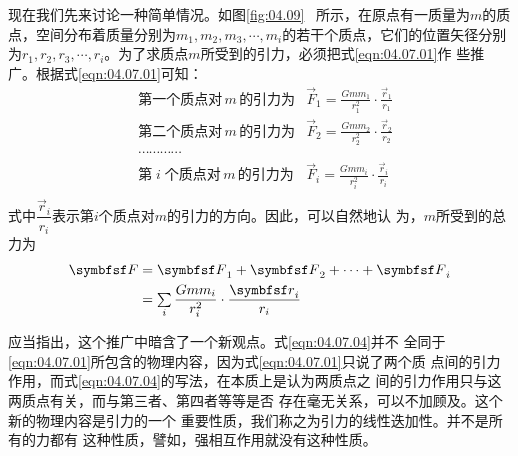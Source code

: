 现在我们先来讨论一种简单情况。如图\ref{fig:04.09}~
所示，在原点有一质量为$ m $的质点，空间分布着质量分别为$ m _ { 1 } , m _ { 2 } , m _ { 3 } , \cdots , m _ { i } $的若干个质点，它们的位置矢径分别为$ r _ { 1 } , r _ { 2 } ,
  r _ { 3 } , \cdots , r _ { i } $。为了求质点$ m $所受到的引力，必须把式\eqref{eqn:04.07.01}作
些推广。根据式\eqref{eqn:04.07.01}可知：
{\setlength{\mathindent}{2em}
\begin{equation}\label{eqn:04.07.03}
  \begin{aligned}
    \mbox{} & \text{第一个质点对}\,m\,\text{的引力为}
            & \vec{F} _ { 1 } = \frac { G m m _ { 1 } } { r _ 1 ^ { 2 } } \cdot \frac { \vec{r} _ { 1 } } { r _ { 1 } } \\
    \mbox{} & \text{第二个质点对}\,m\,\text{的引力为}
            & \vec{F} _ { 2 } = \frac { G m m _ { 2 } } { r _ 2 ^ { 2 } } \cdot \frac { \vec{r} _ { 2 } } { r _ { 2 } } \\
    \mbox{} & \cdots \cdots \cdots \cdots                                                                               \\
    \mbox{} & \text{第}\;i\;\text{个质点对}\,m\,\text{的引力为}
            & \vec{F} _ { i } = \frac { G m m _ { i } } { r _ i ^ { 2 } } \cdot \frac { \vec{r} _ { i } } { r _ { i } } \\
  \end{aligned}
\end{equation}}%
式中$ \dfrac { \vec{r} _ { i } } { r _ { i } } $表示第$ i $个质点对$ m $的引力的方向。因此，可以自然地认
为，$ m $所受到的总力为
\begin{equation}\label{eqn:04.07.04}
  \begin{aligned}
    \vec{F} & =  \vec{F} _ { 1 } + \vec{F} _ { 2 } + \cdots + \vec{F} _ { i }                                        \\
                                                                              & = \sumx _ i { \dfrac { G m m _ { i } } { r _ { i } ^ 2 } \cdot \dfrac { \vec{r} _ { i } } { r _ { i } } }
  \end{aligned}
\end{equation}

应当指出，这个推广中暗含了一个新观点。式\eqref{eqn:04.07.04}并不
全同于\eqref{eqn:04.07.01}所包含的物理内容，因为式\eqref{eqn:04.07.01}只说了两个质
点间的引力作用，而式\eqref{eqn:04.07.04}的写法，在本质上是认为两质点之
间的引力作用只与这两质点有关，而与第三者、第四者等等是否
存在毫无关系，可以不加顾及。这个新的物理内容是引力的一个
重要性质，我们称之为引力的线性迭加性。并不是所有的力都有
这种性质，譬如，强相互作用就没有这种性质。

